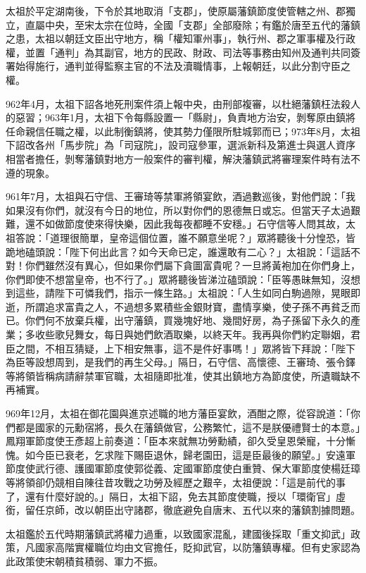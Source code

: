 太祖於平定湖南後，下令於其地取消「支郡」，使原屬藩鎮節度使管轄之州、郡獨立，直屬中央，至宋太宗在位時，全國「支郡」全部廢除；有鑑於唐至五代的藩鎮之患，太祖以朝廷文臣出守地方，稱「權知軍州事」，執行州、郡之軍事權及行政權，並置「通判」為其副官，地方的民政、財政、司法等事務由知州及通判共同簽署始得施行，通判並得監察主官的不法及瀆職情事，上報朝廷，以此分割守臣之權。

962年4月，太祖下詔各地死刑案件須上報中央，由刑部複審，以杜絕藩鎮枉法殺人的惡習；963年1月，太祖下令每縣設置一「縣尉」，負責地方治安，剝奪原由鎮將任命親信任職之權，以此制衡鎮將，使其勢力僅限所駐城郭而已；973年8月，太祖下詔改各州「馬步院」為「司寇院」，設司寇參軍，選派新科及第進士與選人資序相當者擔任，剝奪藩鎮對地方一般案件的審判權，解決藩鎮武將審理案件時有法不遵的現象。

961年7月，太祖與石守信、王審琦等禁軍將領宴飲，酒過數巡後，對他們說：「我如果沒有你們，就沒有今日的地位，所以對你們的恩德無日或忘。但當天子太過艱難，還不如做節度使來得快樂，因此我每夜都睡不安穩。」石守信等人問其故，太祖答說：「道理很簡單，皇帝這個位置，誰不願意坐呢？」眾將聽後十分惶恐，皆跪地磕頭說：「陛下何出此言？如今天命已定，誰還敢有二心？」太祖說：「這話不對！你們雖然沒有異心，但如果你們屬下貪圖富貴呢？一旦將黃袍加在你們身上，你們即使不想當皇帝，也不行了。」眾將聽後皆涕泣磕頭說：「臣等愚昧無知，沒想到這些，請陛下可憐我們，指示一條生路。」太祖說：「人生如同白駒過隙，晃眼即逝，所謂追求富貴之人，不過想多累積些金銀財寶，盡情享樂，使子孫不再貧乏而已。你們何不放棄兵權，出守藩鎮，買幾塊好地、幾間好房，為子孫留下永久的產業；多收些歌兒舞女，每日與她們飲酒取樂，以終天年。我再與你們約定聯姻，君臣之間，不相互猜疑，上下相安無事，這不是件好事嗎！」眾將皆下拜說：「陛下為臣等設想周到，是我們的再生父母。」隔日，石守信、高懷德、王審琦、張令鐸等將領皆稱病請辭禁軍官職，太祖隨即批准，使其出鎮地方為節度使，所遺職缺不再補實。

969年12月，太祖在御花園與進京述職的地方藩臣宴飲，酒酣之際，從容說道：「你們都是國家的元勳宿將，長久在藩鎮做官，公務繁忙，這不是朕優禮賢士的本意。」鳳翔軍節度使王彥超上前奏道：「臣本來就無功勞勳績，卻久受皇恩榮寵，十分慚愧。如今臣已衰老，乞求陛下賜臣退休，歸老園田，這是臣最後的願望。」安遠軍節度使武行德、護國軍節度使郭從義、定國軍節度使白重贊、保大軍節度使楊廷璋等將領卻仍競相自陳往昔攻戰之功勞及經歷之艱辛，太祖便說：「這是前代的事了，還有什麼好說的。」隔日，太祖下詔，免去其節度使職，授以「環衛官」虛銜，留任京師，改以朝臣出守諸郡，徹底避免自唐末、五代以來的藩鎮割據問題。

太祖鑑於五代時期藩鎮武將權力過重，以致國家混亂，建國後採取「重文抑武」政策，凡國家高階實權職位均由文官擔任，貶抑武官，以防籓鎮專權。但有史家認為此政策使宋朝積貧積弱、軍力不振。


